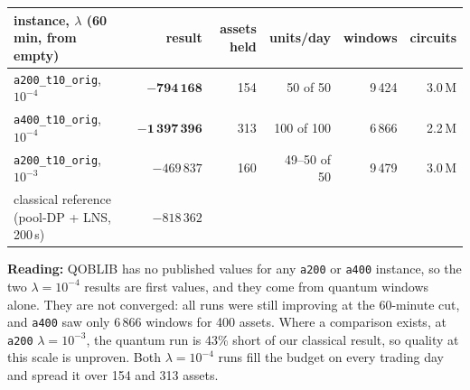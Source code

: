 \documentclass[11pt]{article}
\begin{document}
\begin{center}\small
\begin{tabularx}{\textwidth}{@{}Lrrrrr@{}}
\toprule
instance, $\lambda$ (60 min, from empty) & result & assets held & units/day & windows & circuits\\
\midrule
{}
\texttt{a200\_t10\_orig}, $10^{-4}$ & $\mathbf{-794\,168}$ & 154 & 50 of 50 & 9\,424 & 3.0\,M\\
\texttt{a400\_t10\_orig}, $10^{-4}$ & $\mathbf{-1\,397\,396}$ & 313 & 100 of 100 & 6\,866 & 2.2\,M\\
\texttt{a200\_t10\_orig}, $10^{-3}$ & $-469\,837$ & 160 & 49--50 of 50 & 9\,479 & 3.0\,M\\
\quad classical reference (pool-DP + LNS, 200\,s) & $-818\,362$ & & & & \\
\bottomrule
\end{tabularx}
\end{center}
\noindent\textbf{Reading:} QOBLIB has no published values for any \texttt{a200} or \texttt{a400}
instance, so the two $\lambda=10^{-4}$ results are first values, and they come from quantum windows
alone. They are not converged: all runs were still improving at the 60-minute cut, and \texttt{a400}
saw only 6\,866 windows for 400 assets. Where a comparison exists, at \texttt{a200} $\lambda=10^{-3}$,
the quantum run is 43\% short of our classical result, so quality at this scale is unproven. Both
$\lambda=10^{-4}$ runs fill the budget on every trading day and spread it over 154 and 313 assets.

\end{document}
